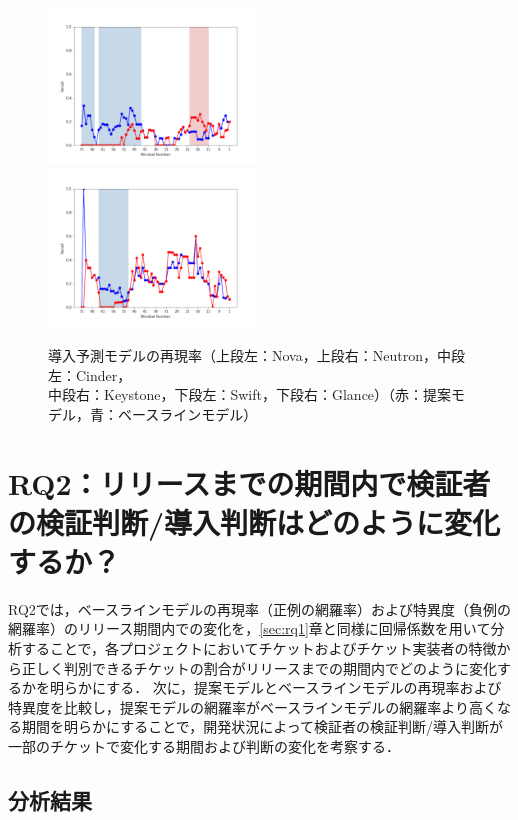 \documentclass[11pt]{jreport}
\newcommand{\rqtwo}{リリースまでの期間内で検証者の検証判断/導入判断はどのように変化するか？}
\begin{document}
\begin{figure}[H]
\begin{minipage}{\textwidth}
\begin{center}
    \includegraphics[width=0.495\textwidth]{Uenaka_fig/RQ1_result/Swift_merge_Recall.pdf}
    \includegraphics[width=0.495\textwidth]{Uenaka_fig/RQ1_result/Glance_merge_Recall.pdf}
    \caption{導入予測モデルの再現率（上段左：Nova，上段右：Neutron，中段左：Cinder，\\ 中段右：Keystone，下段左：Swift，下段右：Glance）（赤：提案モデル，青：ベースラインモデル）}
    \label{fig:merge_r}
\end{center}
\vspace{0.08\textheight}
\end{minipage}
\end{figure}


\chapter{RQ2：\rqtwo}\label{sec:rq2}
RQ2では，ベースラインモデルの再現率（正例の網羅率）および特異度（負例の網羅率）のリリース期間内での変化を，\ref{sec:rq1}章と同様に回帰係数を用いて分析することで，各プロジェクトにおいてチケットおよびチケット実装者の特徴から正しく判別できるチケットの割合がリリースまでの期間内でどのように変化するかを明らかにする．
次に，提案モデルとベースラインモデルの再現率および特異度を比較し，提案モデルの網羅率がベースラインモデルの網羅率より高くなる期間を明らかにすることで，開発状況によって検証者の検証判断/導入判断が一部のチケットで変化する期間および判断の変化を考察する．

\section{分析結果}
\end{document}
